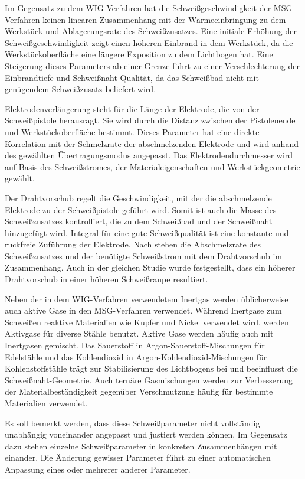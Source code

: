 Im Gegensatz zu dem WIG-Verfahren hat die Schweißgeschwindigkeit der MSG-Verfahren keinen linearen Zusammenhang mit der Wärmeeinbringung zu dem Werkstück und Ablagerungsrate des Schweißzusatzes. Eine initiale Erhöhung der Schweißgeschwindigkeit zeigt einen höheren Einbrand in dem Werkstück, da die Werkstückoberfläche eine längere Exposition zu dem Lichtbogen hat. Eine Steigerung dieses Parameters ab einer Grenze führt zu einer Verschlechterung der Einbrandtiefe und Schweißnaht-Qualität, da das Schweißbad nicht mit genügendem Schweißzusatz beliefert wird. \autocite[42]{Pires_WeldingRobots_2006}

Elektrodenverlängerung steht für die Länge der Elektrode, die von der Schweißpistole herausragt. Sie wird durch die Distanz zwischen der Pistolenende und Werkstückoberfläche bestimmt. Dieses Parameter hat eine direkte Korrelation mit der Schmelzrate der abschmelzenden Elektrode und wird anhand des gewählten Übertragungsmodus angepasst. Das Elektrodendurchmesser wird auf Basis des Schweißstromes, der Materialeigenschaften und Werkstückgeometrie gewählt. \autocite[42-43]{Pires_WeldingRobots_2006}

Der Drahtvorschub regelt die Geschwindigkeit, mit der die abschmelzende Elektrode zu der Schweißpistole geführt wird. Somit ist auch die Masse des Schweißzusatzes kontrolliert, die zu dem Schweißbad und der Schweißnaht hinzugefügt wird. Integral für eine gute Schweißqualität ist eine konstante und ruckfreie Zuführung der Elektrode. Nach \textcite{Senthilkumar2017} stehen die Abschmelzrate des Schweißzusatzes und der benötigte Schweißstrom mit dem Drahtvorschub im Zusammenhang. Auch in der gleichen Studie wurde festgestellt, dass ein höherer Drahtvorschub in einer höheren Schweißraupe resultiert.

Neben der in dem WIG-Verfahren verwendetem Inertgas werden üblicherweise auch aktive Gase in den MSG-Verfahren verwendet. Während Inertgase zum Schweißen reaktive Materialien wie Kupfer und Nickel verwendet wird, werden Aktivgase für diverse Stähle benutzt. Aktive Gase werden häufig auch mit Inertgasen gemischt. Das Sauerstoff in Argon-Sauerstoff-Mischungen für Edelstähle und das Kohlendioxid in Argon-Kohlendioxid-Mischungen für Kohlenstoffstähle trägt zur Stabilisierung des Lichtbogens bei und beeinflusst die Schweißnaht-Geometrie. Auch ternäre Gasmischungen werden zur Verbesserung der Materialbeständigkeit gegenüber Verschmutzung häufig für bestimmte Materialien verwendet. \autocite[42-43]{Pires_WeldingRobots_2006}

Es soll bemerkt werden, dass diese Schweißparameter nicht vollständig unabhängig voneinander angepasst und justiert werden können. Im Gegensatz dazu stehen einzelne Schweißparameter in konkreten Zusammenhängen mit einander. Die Änderung gewisser Parameter führt zu einer automatischen Anpassung eines oder mehrerer anderer Parameter. \autocite[40]{Pires_WeldingRobots_2006}

